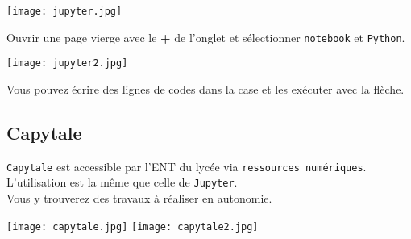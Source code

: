 \begin{center}
\texttt{[image: jupyter.jpg]}
\end{center}

Ouvrir une page vierge avec le \textbf{+} de l'onglet et sélectionner \texttt{notebook} et \texttt{Python}.


\begin{center}
\texttt{[image: jupyter2.jpg]}
\end{center}

Vous pouvez écrire des lignes de codes dans la case et les exécuter avec la flèche.

\subsection{Capytale}

\texttt{Capytale} est accessible par l'ENT du lycée via \texttt{ressources numériques}. L'utilisation est la même que celle de \texttt{Jupyter}.\\
Vous y trouverez des travaux à réaliser en autonomie.

\begin{center}
\texttt{[image: capytale.jpg]}
\texttt{[image: capytale2.jpg]}
\end{center}



